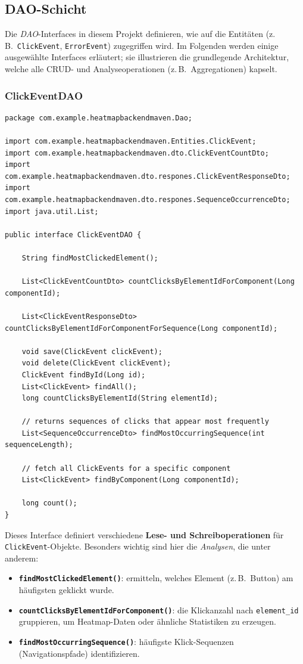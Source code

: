\documentclass[12pt,oneside]{article}
\begin{document}
\subsection{DAO-Schicht}
Die \emph{DAO}-Interfaces in diesem Projekt definieren, wie auf die Entitäten (z.\,B.\ \lstinline|ClickEvent|, \lstinline|ErrorEvent|) zugegriffen wird. Im Folgenden werden einige ausgewählte Interfaces erläutert; sie illustrieren die grundlegende Architektur, welche alle CRUD- und Analyseoperationen (z.\,B.\ Aggregationen) kapselt.

\subsubsection{ClickEventDAO}
\label{subsec:clickEventDAO}
\lstset{style=java}
\begin{lstlisting}
package com.example.heatmapbackendmaven.Dao;

import com.example.heatmapbackendmaven.Entities.ClickEvent;
import com.example.heatmapbackendmaven.dto.ClickEventCountDto;
import com.example.heatmapbackendmaven.dto.respones.ClickEventResponseDto;
import com.example.heatmapbackendmaven.dto.respones.SequenceOccurrenceDto;
import java.util.List;

public interface ClickEventDAO {

    String findMostClickedElement();

    List<ClickEventCountDto> countClicksByElementIdForComponent(Long componentId);

    List<ClickEventResponseDto> countClicksByElementIdForComponentForSequence(Long componentId);

    void save(ClickEvent clickEvent);
    void delete(ClickEvent clickEvent);
    ClickEvent findById(Long id);
    List<ClickEvent> findAll();
    long countClicksByElementId(String elementId);

    // returns sequences of clicks that appear most frequently
    List<SequenceOccurrenceDto> findMostOccurringSequence(int sequenceLength);

    // fetch all ClickEvents for a specific component
    List<ClickEvent> findByComponent(Long componentId);

    long count();
}
\end{lstlisting}

\noindent
Dieses Interface definiert verschiedene \textbf{Lese- und Schreiboperationen} für \lstinline|ClickEvent|-Objekte. Besonders wichtig sind hier die \emph{Analysen}, die unter anderem:
\begin{itemize}
    \item \textbf{\lstinline|findMostClickedElement()|}: ermitteln, welches Element (z.\,B.\ Button) am häufigsten geklickt wurde.
    \item \textbf{\lstinline|countClicksByElementIdForComponent()|}: die Klickanzahl nach \lstinline|element_id| gruppieren, um Heatmap-Daten oder ähnliche Statistiken zu erzeugen.
    \item \textbf{\lstinline|findMostOccurringSequence()|}: häufigste Klick-Sequenzen (Navigationspfade) identifizieren.
\end{itemize}
\end{document}
